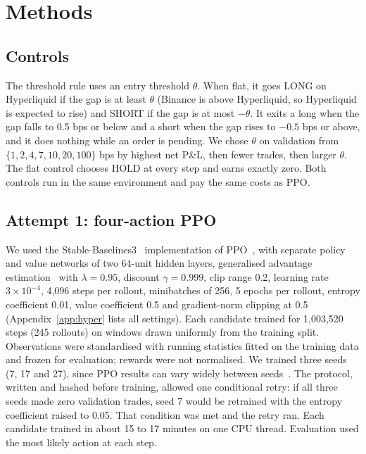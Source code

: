 \documentclass[12pt,a4paper]{article}
\DeclareRobustCommand{\bps}{\ifmmode\,\text{bps}\else\,bps\fi}
\begin{document}
\section{Methods}\label{sec:methods}

\subsection{Controls}
The threshold rule uses an entry threshold $\theta$. When flat, it goes LONG on
Hyperliquid if the gap is at least $\theta$ (Binance is above Hyperliquid, so Hyperliquid is
expected to rise) and SHORT if the gap is at most $-\theta$. It exits a long when the gap
falls to 0.5\bps{} or below and a short when the gap rises to $-0.5$\bps{} or above, and it
does nothing while an order is pending. We chose $\theta$ on validation from
$\{1, 2, 4, 7, 10, 20, 100\}$\bps{} by highest net P\&L, then fewer trades, then larger
$\theta$. The flat control chooses HOLD at every step and earns exactly zero. Both controls
run in the same environment and pay the same costs as PPO.

\subsection{Attempt 1: four-action PPO}
We used the Stable-Baselines3~\cite{sb3} implementation of PPO~\cite{ppo}, with separate
policy and value networks of two 64-unit hidden layers, generalised advantage
estimation~\cite{gae} with $\lambda=0.95$, discount $\gamma=0.999$, clip range 0.2, learning
rate $3\times10^{-4}$, 4,096 steps per rollout, minibatches of 256, 5 epochs per rollout,
entropy coefficient 0.01, value coefficient 0.5 and gradient-norm clipping at 0.5
(Appendix~\ref{app:hyper} lists all settings). Each candidate trained for 1,003,520 steps
(245 rollouts) on windows drawn uniformly from the training split. Observations were
standardised with running statistics fitted on the training data and frozen for evaluation;
rewards were not normalised. We trained three seeds (7, 17 and 27), since PPO results can
vary widely between seeds~\cite{henderson}. The protocol, written and hashed before
training, allowed one conditional retry: if all three seeds made zero validation trades,
seed 7 would be retrained with the entropy coefficient raised to 0.05. That condition was
met and the retry ran. Each candidate trained in about 15 to 17 minutes on one CPU thread.
Evaluation used the most likely action at each step.
\end{document}
